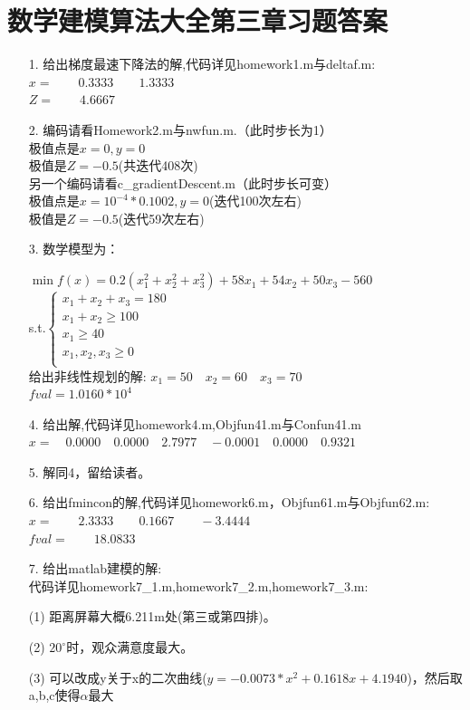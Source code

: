 \documentclass[a4paper,20pt]{article}
\begin{document}
\section{数学建模算法大全第三章习题答案}
\begin{itemize}
    \item[1.] 给出梯度最速下降法的解,代码详见homework1.m与deltaf.m:
        \\$ x =\qquad   0.3333 \qquad 1.3333$    \\$Z =\qquad  4.6667$
    \item[2.] 编码请看Homework2.m与nwfun.m.（此时步长为1）
        \\极值点是$x=0,y=0$
        \\极值是$Z=-0.5$(共迭代408次)
        \\另一个编码请看c\_gradientDescent.m（此时步长可变）
        \\极值点是$ x=10^{-4}*0.1002,y=0$(迭代100次左右)
        \\极值是$Z=-0.5$(迭代59次左右)
    \item[3.]   数学模型为：
        \par \noindent $\min f(x)=0.2(x_1^2+x_2^2+x_3^2)+58x_1+54x_2+50x_3-560$
        \\s.t.$\left\{\begin{matrix}
                x_1+x_2+x_3=180    \\
                x_1+x_2\geq 100    \\
                x_1 \geq 40        \\
                x_1,x_2,x_3 \geq 0 \\
            \end{matrix} \right.$
        \\给出非线性规划的解:   $x_1=50
            \quad x_2=60
            \quad x_3=70$
        \\$fval =1.0160*10^{4}$
    \item[4.] 给出解,代码详见homework4.m,Objfun41.m与Confun41.m
        \\$x =\quad  0.0000  \quad  0.0000  \quad  2.7977 \quad  -0.0001  \quad  0.0000  \quad  0.9321$
    \item[5.] 解同4，留给读者。
    \item[6.] 给出fmincon的解,代码详见homework6.m，Objfun61.m与Objfun62.m:
        \\$x =\qquad    2.3333 \qquad   0.1667 \qquad  -3.4444$
            \\$fval =\qquad  18.0833 $
        \item[7.]给出matlab建模的解:
        \\代码详见homework7\_1.m,homework7\_2.m,homework7\_3.m:
        \par \noindent (1) 距离屏幕大概6.211m处(第三或第四排)。
        \par \noindent (2)  $20^\circ$时，观众满意度最大。
        \par \noindent (3) 可以改成y关于x的二次曲线($y=-0.0073*x^2+0.1618x+4.1940$)，然后取a,b,c使得$\alpha$最大
\end{itemize}
\end{document}
